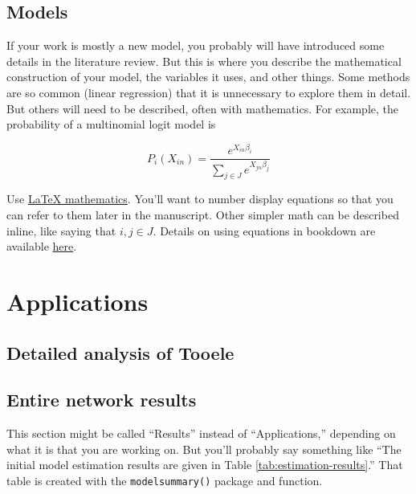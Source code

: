 \documentclass[3p, authoryear]{elsarticle} %
\begin{document}
\hypertarget{models}{%
\subsection{Models}\label{models}}

If your work is mostly a new model, you probably will have introduced some
details in the literature review. But this is where you describe the
mathematical construction of your model, the variables it uses, and other
things. Some methods are so common (linear regression) that it is unnecessary to
explore them in detail. But others will need to be described, often with
mathematics. For example, the probability of a multinomial logit model is

\begin{equation}
  P_i(X_{in}) = \frac{e^{X_{in}\beta_i}}{\sum_{j \in J}e^{X_{jn}\beta_j}}
  \label{eq:mnl}
\end{equation}

Use \href{https://www.overleaf.com/learn/latex/mathematical_expressions}{LaTeX mathematics}.
You'll want to number display equations so that you can
refer to them later in the manuscript. Other simpler math can be described inline,
like saying that \(i, j \in J\). Details on using equations in bookdown are available
\href{https://bookdown.org/yihui/bookdown/markdown-extensions-by-bookdown.html}{here}.

\hypertarget{applications}{%
\section{Applications}\label{applications}}

\hypertarget{detailed-analysis-of-tooele}{%
\subsection{Detailed analysis of Tooele}\label{detailed-analysis-of-tooele}}

\hypertarget{entire-network-results}{%
\subsection{Entire network results}\label{entire-network-results}}

This section might be called ``Results'' instead of ``Applications,'' depending
on what it is that you are working on. But you'll probably say something like
``The initial model estimation results are given in Table \ref{tab:estimation-results}.''
That table is created with the \texttt{modelsummary()} package and function.
\end{document}
